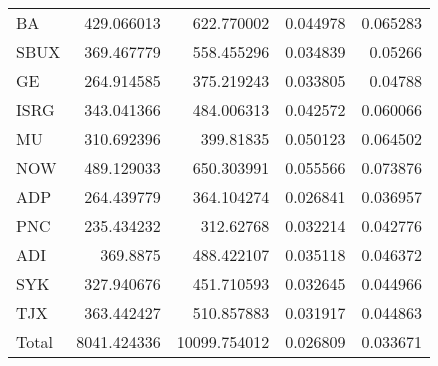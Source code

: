 \documentclass{gji}
\begin{document}
{\begin{tabular}{@{}lrrrr}
   BA &  429.066013 &   622.770002 & 0.044978 & 0.065283 \\
 SBUX &  369.467779 &   558.455296 & 0.034839 &  0.05266 \\
   GE &  264.914585 &   375.219243 & 0.033805 &  0.04788 \\
 ISRG &  343.041366 &   484.006313 & 0.042572 & 0.060066 \\
   MU &  310.692396 &    399.81835 & 0.050123 & 0.064502 \\
  NOW &  489.129033 &   650.303991 & 0.055566 & 0.073876 \\
  ADP &  264.439779 &   364.104274 & 0.026841 & 0.036957 \\
  PNC &  235.434232 &    312.62768 & 0.032214 & 0.042776 \\
  ADI &    369.8875 &   488.422107 & 0.035118 & 0.046372 \\
  SYK &  327.940676 &   451.710593 & 0.032645 & 0.044966 \\
  TJX &  363.442427 &   510.857883 & 0.031917 & 0.044863 \\
Total & 8041.424336 & 10099.754012 & 0.026809 & 0.033671 \\
\hline
\end{tabular}}
\end{document}
